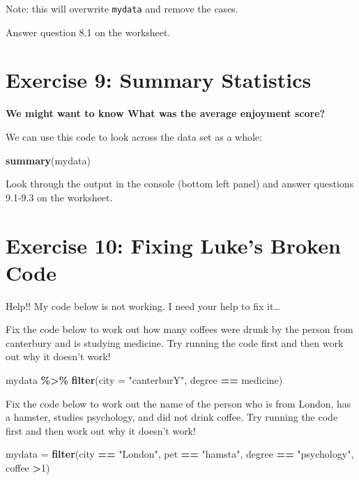 \documentclass[
]{book}
\newenvironment{Shaded}{\begin{snugshade}}{\end{snugshade}}
\newcommand{\AttributeTok}[1]{\textcolor[rgb]{0.13,0.29,0.53}{#1}}
\newcommand{\DecValTok}[1]{\textcolor[rgb]{0.00,0.00,0.81}{#1}}
\newcommand{\FunctionTok}[1]{\textcolor[rgb]{0.13,0.29,0.53}{\textbf{#1}}}
\newcommand{\NormalTok}[1]{#1}
\newcommand{\OtherTok}[1]{\textcolor[rgb]{0.56,0.35,0.01}{#1}}
\newcommand{\SpecialCharTok}[1]{\textcolor[rgb]{0.81,0.36,0.00}{\textbf{#1}}}
\newcommand{\StringTok}[1]{\textcolor[rgb]{0.31,0.60,0.02}{#1}}
\let\oldsection\section
\renewcommand{\section}{\needspace{5\baselineskip}\oldsection}
\begin{document}
Note: this will overwrite \texttt{mydata} and remove the cases.

Answer question 8.1 on the worksheet.

\section{Exercise 9: Summary Statistics}\label{exercise-9-summary-statistics}

\textbf{We might want to know What was the average enjoyment score?}

We can use this code to look across the data set as a whole:

\begin{Shaded}
\begin{Highlighting}[]
\FunctionTok{summary}\NormalTok{(mydata)}
\end{Highlighting}
\end{Shaded}

Look through the output in the console (bottom left panel) and answer questions 9.1-9.3 on the worksheet.

\section{Exercise 10: Fixing Luke's Broken Code}\label{exercise-10-fixing-lukes-broken-code}

Help!! My code below is not working. I need your help to fix it\ldots{}

Fix the code below to work out how many coffees were drunk by the person from canterbury and is studying medicine. Try running the code first and then work out why it doesn't work!

\begin{Shaded}
\begin{Highlighting}[]
\NormalTok{mydata }\SpecialCharTok{\%\textgreater{}\%}
  \FunctionTok{filter}\NormalTok{(}\AttributeTok{city =} \StringTok{"canterburY"}\NormalTok{, degree }\SpecialCharTok{==}\NormalTok{ medicine)}
\end{Highlighting}
\end{Shaded}

Fix the code below to work out the name of the person who is from London, has a hamster, studies psychology, and did not drink coffee. Try running the code first and then work out why it doesn't work!

\begin{Shaded}
\begin{Highlighting}[]
\NormalTok{mydata }\OtherTok{=}
  \FunctionTok{filter}\NormalTok{(city }\SpecialCharTok{==} \StringTok{"London"}\NormalTok{, pet }\SpecialCharTok{==} \StringTok{"hamsta"}\NormalTok{, degree }\SpecialCharTok{==} \StringTok{"psychology"}\NormalTok{, coffee }\SpecialCharTok{\textgreater{}}\DecValTok{1}\NormalTok{)}
\end{Highlighting}
\end{Shaded}
\end{document}
